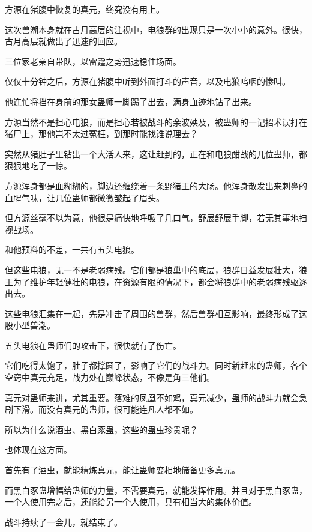 
\begin{this_body}

方源在猪腹中恢复的真元，终究没有用上。

这次兽潮本身就在古月高层的注视中，电狼群的出现只是一次小小的意外。很快，古月高层就做出了迅速的回应。

三位家老亲自带队，以雷霆之势迅速稳住场面。

仅仅十分钟之后，方源在猪腹中听到外面打斗的声音，以及电狼呜咽的惨叫。

他连忙将挡在身前的那女蛊师一脚踢了出去，满身血迹地钻了出来。

方源当然不是担心电狼，而是担心若被战斗的余波殃及，被蛊师的一记招术误打在猪尸上，那他岂不太过冤枉，到那时能找谁说理去？

突然从猪肚子里钻出一个大活人来，这让赶到的，正在和电狼酣战的几位蛊师，都狠狠地吃了一惊。

方源浑身都是血糊糊的，脚边还缠绕着一条野猪王的大肠。他浑身散发出来刺鼻的血腥气味，让几位蛊师都微微皱起了眉头。

但方源丝毫不以为意，他很是痛快地呼吸了几口气，舒展舒展手脚，若无其事地扫视战场。

和他预料的不差，一共有五头电狼。

但这些电狼，无一不是老弱病残。它们都是狼巢中的底层，狼群日益发展壮大，狼王为了维护年轻健壮的电狼，在资源有限的情况下，都会将狼群中的老弱病残驱逐出去。

这些电狼汇集在一起，先是冲击了周围的兽群，然后兽群相互影响，最终形成了这股小型兽潮。

五头电狼在蛊师们的攻击下，很快就有了伤亡。

它们吃得太饱了，肚子都撑圆了，影响了它们的战斗力。同时新赶来的蛊师，各个空窍中真元充足，战力处在巅峰状态，不像是角三他们。

真元对蛊师来讲，尤其重要。落难的凤凰不如鸡，真元减少，蛊师的战斗力就会急剧下滑。而没有真元的蛊师，很可能连凡人都不如。

所以为什么说酒虫、黑白豕蛊，这些的蛊虫珍贵呢？

也体现在这方面。

首先有了酒虫，就能精炼真元，能让蛊师变相地储备更多真元。

而黑白豕蛊增幅给蛊师的力量，不需要真元，就能发挥作用。并且对于黑白豕蛊，一个人使用完之后，还能给另一个人使用，具有相当大的集体价值。

战斗持续了一会儿，就结束了。


\end{this_body}
